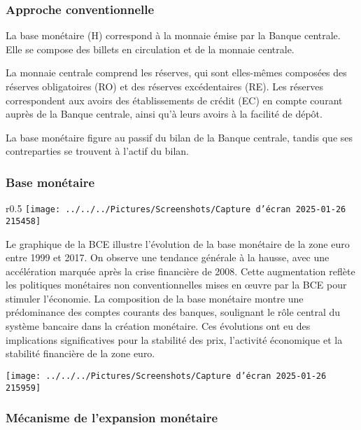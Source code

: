 \documentclass[a4paper, 12pt]{report}
\begin{document}
\subsubsection{Approche conventionnelle}



La base monétaire (H) correspond à la monnaie émise par la Banque centrale. Elle se compose des billets en circulation et de la monnaie centrale.

La monnaie centrale comprend les réserves, qui sont elles-mêmes composées des réserves obligatoires (RO) et des réserves excédentaires (RE). Les réserves correspondent aux avoirs des établissements de crédit (EC) en compte courant auprès de la Banque centrale, ainsi qu'à leurs avoirs à la facilité de dépôt.

La base monétaire figure au passif du bilan de la Banque centrale, tandis que ses contreparties se trouvent à l'actif du bilan.
	
\subsubsection{Base monétaire}
	
\begin{wrapfigure}{r}{0.5\textwidth}
	\centering
\texttt{[image: ../../../Pictures/Screenshots/Capture d'écran 2025-01-26 215458]}
\end{wrapfigure}

Le graphique de la BCE illustre l'évolution de la base monétaire de la zone euro entre 1999 et 2017. On observe une tendance générale à la hausse, avec une accélération marquée après la crise financière de 2008. Cette augmentation reflète les politiques monétaires non conventionnelles mises en œuvre par la BCE pour stimuler l'économie. La composition de la base monétaire montre une prédominance des comptes courants des banques, soulignant le rôle central du système bancaire dans la création monétaire. Ces évolutions ont eu des implications significatives pour la stabilité des prix, l'activité économique et la stabilité financière de la zone euro.

\begin{center}
	\texttt{[image: ../../../Pictures/Screenshots/Capture d'écran 2025-01-26 215959]}
\end{center}
	
\subsubsection{Mécanisme de l'expansion monétaire}
	
\end{document}
